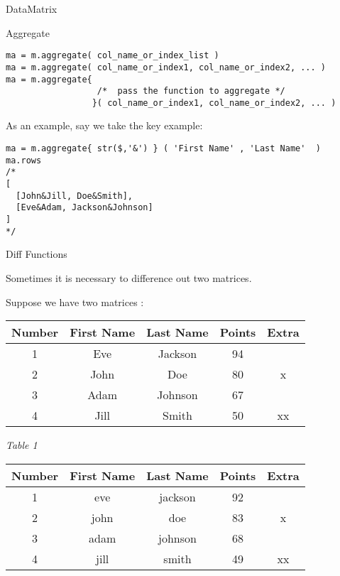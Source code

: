 \begin{section}{DataMatrix}
\begin{subsection}{Aggregate}
\begin{lstlisting}[style=JexlStyle]
ma = m.aggregate( col_name_or_index_list )
ma = m.aggregate( col_name_or_index1, col_name_or_index2, ... )
ma = m.aggregate{ 
                  /*  pass the function to aggregate */  
                 }( col_name_or_index1, col_name_or_index2, ... )
\end{lstlisting}

As an example, say we take the key example:

\begin{lstlisting}[style=JexlStyle]
ma = m.aggregate{ str($,'&') } ( 'First Name' , 'Last Name'  )
ma.rows 
/* 
[ 
  [John&Jill, Doe&Smith], 
  [Eve&Adam, Jackson&Johnson]
] 
*/
\end{lstlisting}
\end{subsection}


\begin{subsection}{Diff Functions}

Sometimes it is necessary to difference out two matrices.

Suppose we have two matrices :

\begin{center}\label{matrix-diff}

\begin{tabular}{ |c|c|c|c|c| } 
 \hline
 Number	& First Name & Last Name & Points & Extra \\ 
 \hline 
   1    & Eve	     & Jackson	& 94      & \\
   2    & John       &  Doe	    & 80      &  x \\ 
   3    & Adam       & Johnson	& 67      &  \\	
   4    & Jill       & Smith	& 50      & xx \\  
 \hline  
\end{tabular}

\emph{ Table 1 }


\begin{tabular}{ |c|c|c|c|c| } 
 \hline
 Number	& First Name & Last Name & Points & Extra \\ 
 \hline 
   1    & eve	     & jackson	& 92      & \\
   2    & john       & doe	    & 83      &  x \\ 
   3    & adam       & johnson	& 68      &  \\	
   4    & jill       & smith	& 49      & xx \\  
 \hline
\end{tabular}


\end{center}
\end{subsection}
\end{section}
